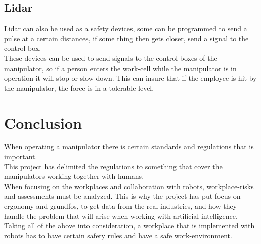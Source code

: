 \subsection{Lidar}
Lidar can also be used as a safety devices, some can be programmed to send a pulse at a certain distances, if some thing then gets closer, send a signal to the control box.\\ 

These devices can be used to send signals to the control boxes of the manipulator, so if a person enters the work-cell while the manipulator is in operation it will stop or slow down. This can insure that if the employee is hit by the manipulator, the force is in a tolerable level.\\

\section{Conclusion}

When operating a manipulator there is certain standards and regulations that is important.\\
This project has delimited the regulations to something that cover the manipulators working together with humans.\\
When focusing on the workplaces and collaboration with robots, workplace-risks and assessments must be analyzed. This is why the project has put focus on ergonomy and grundfos, to get data from the real industries, and how they handle the problem that will arise when working with artificial intelligence.\\
Taking all of the above into consideration, a workplace that is implemented with robots has to have certain safety rules and have a safe work-environment.